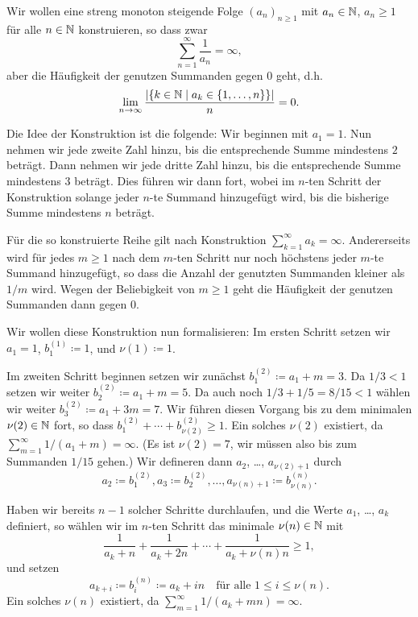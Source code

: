 \documentclass[a4paper,10pt]{article}
\begin{document}
Wir wollen eine streng monoton steigende Folge $(a_n)_{n \geq 1}$ mit $a_n \in \mathbb{N}$, $a_n \geq 1$ für alle $n \in \mathbb{N}$ konstruieren, so dass zwar
\[
 \sum_{n=1}^\infty \frac{1}{a_n} = \infty,
\]
aber die Häufigkeit der genutzen Summanden gegen $0$ geht, d.h.
\begin{equation}\label{eqn: Grenzwert}
 \lim_{n \to \infty} \frac{|\{k \in \mathbb{N} \mid a_k \in \{1, \dotsc, n\}\}|}{n} = 0.
\end{equation}

Die Idee der Konstruktion ist die folgende: Wir beginnen mit $a_1 = 1$. Nun nehmen wir jede zweite Zahl hinzu, bis die entsprechende Summe mindestens $2$ beträgt. Dann nehmen wir jede dritte Zahl hinzu, bis die entsprechende Summe mindestens $3$ beträgt. Dies führen wir dann fort, wobei im $n$-ten Schritt der Konstruktion solange jeder $n$-te Summand hinzugefügt wird, bis die bisherige Summe mindestens $n$ beträgt.

Für die so konstruierte Reihe gilt nach Konstruktion $\sum_{k=1}^\infty a_k = \infty$. Andererseits wird für jedes $m \geq 1$ nach dem $m$-ten Schritt nur noch höchstens jeder $m$-te Summand hinzugefügt, so dass die Anzahl der genutzten Summanden kleiner als $1/m$ wird. Wegen der Beliebigkeit von $m \geq 1$ geht die Häufigkeit der genutzen Summanden dann gegen $0$.

Wir wollen diese Konstruktion nun formalisieren: Im ersten Schritt setzen wir $a_1 = 1$, $b^{(1)}_1 \coloneqq 1$, und $\nu(1) \coloneqq 1$.

Im zweiten Schritt beginnen setzen wir zunächst $b^{(2)}_1 \coloneqq a_1 + m = 3$. Da $1/3 < 1$ setzen wir weiter $b^{(2)}_2 \coloneqq a_1 + m = 5$. Da auch noch $1/3 + 1/5 = 8/15 < 1$ wählen wir weiter $b^{(2)}_3 \coloneqq a_1 + 3m = 7$. Wir führen diesen Vorgang bis zu dem minimalen $\nu(2) \in \mathbb{N}$ fort, so dass $b^{(2)}_1 + \dotsb + b^{(2)}_{\nu(2)} \geq 1$. Ein solches $\nu(2)$ existiert, da $\sum_{m=1}^\infty 1/(a_1 + m) = \infty$. (Es ist $\nu(2) = 7$, wir müssen also bis zum Summanden $1/15$ gehen.) Wir defineren dann $a_2$, \dots, $a_{\nu(2)+1}$ durch
\[
 a_2 \coloneqq b^{(2)}_1, a_3 \coloneqq b^{(2)}_2, \dotsc, a_{\nu(n)+1} \coloneqq b^{(n)}_{\nu(n)}.
\]

Haben wir bereits $n-1$ solcher Schritte durchlaufen, und die Werte $a_1$, \dots, $a_k$ definiert, so wählen wir im $n$-ten Schritt das minimale $\nu(n) \in \mathbb{N}$ mit
\[
 \frac{1}{a_k + n} + \frac{1}{a_k + 2n} + \dotsb + \frac{1}{a_k + \nu(n) n} \geq 1,
\]
und setzen
\[
 a_{k + i} \coloneqq b^{(n)}_i \coloneqq a_k + in \quad \text{für alle $1 \leq i \leq \nu(n)$}.
\]
Ein solches $\nu(n)$ existiert, da $\sum_{m=1}^\infty 1/(a_k + mn) = \infty$.
\end{document}
